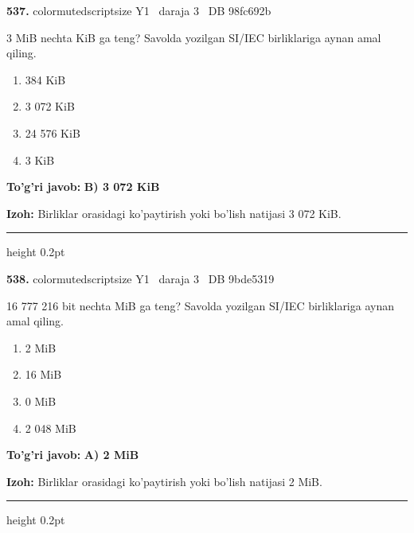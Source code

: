 \documentclass[10pt,a4paper,oneside]{article}
\begin{document}
\noindent\textbf{\color{ink}537.}  {color{muted}scriptsize Y1 \textbullet\ daraja 3 \textbullet\ DB 98fc692b}
\par
3 MiB nechta KiB ga teng? Savolda yozilgan SI/IEC birliklariga aynan amal qiling.
\begin{enumerate}[label=\Alph*),leftmargin=9mm]
\item 384 KiB
\item 3 072 KiB
\item 24 576 KiB
\item 3 KiB
\end{enumerate}
\begin{tcolorbox}[enhanced,breakable,colback=teal!4,colframe=teal!50!black,boxrule=0.5pt,arc=1.1mm,left=3mm,right=3mm,top=1.7mm,bottom=1.7mm,before skip=2mm,after skip=2mm]
\textbf{\color{teal}To'g'ri javob:} \textbf{B) 3 072 KiB}
\par\smallskip
\textbf{Izoh:} Birliklar orasidagi ko'paytirish yoki bo'lish natijasi 3 072 KiB.
\end{tcolorbox}
\vspace{2mm}\hrule height 0.2pt \vspace{3mm}

\noindent\textbf{\color{ink}538.}  {color{muted}scriptsize Y1 \textbullet\ daraja 3 \textbullet\ DB 9bde5319}
\par
16 777 216 bit nechta MiB ga teng? Savolda yozilgan SI/IEC birliklariga aynan amal qiling.
\begin{enumerate}[label=\Alph*),leftmargin=9mm]
\item 2 MiB
\item 16 MiB
\item 0 MiB
\item 2 048 MiB
\end{enumerate}
\begin{tcolorbox}[enhanced,breakable,colback=teal!4,colframe=teal!50!black,boxrule=0.5pt,arc=1.1mm,left=3mm,right=3mm,top=1.7mm,bottom=1.7mm,before skip=2mm,after skip=2mm]
\textbf{\color{teal}To'g'ri javob:} \textbf{A) 2 MiB}
\par\smallskip
\textbf{Izoh:} Birliklar orasidagi ko'paytirish yoki bo'lish natijasi 2 MiB.
\end{tcolorbox}
\vspace{2mm}\hrule height 0.2pt \vspace{3mm}
\end{document}
